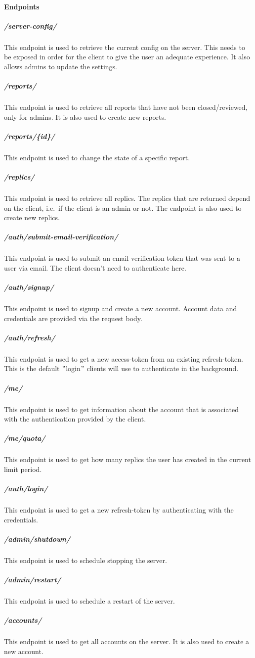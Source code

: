 \paragraph{Endpoints}

\subparagraph{/server-config/} This endpoint is used to retrieve the current config on the server.
This needs to be exposed in order for the client to give the user an adequate experience.
It also allows admins to update the settings.

\subparagraph{/reports/} This endpoint is used to retrieve all reports that have not been closed/reviewed, only for admins.
It is also used to create new reports.

\subparagraph{/reports/\{id\}/} This endpoint is used to change the state of a specific report.

\subparagraph{/replics/} This endpoint is used to retrieve all replics.
The replics that are returned depend on the client, i.e.\ if the client is an admin or not.
The endpoint is also used to create new replics.

\subparagraph{/auth/submit-email-verification/} This endpoint is used to submit an email-verification-token that was sent to a user via email.
The client doesn't need to authenticate here.

\subparagraph{/auth/signup/} This endpoint is used to signup and create a new account.
Account data and credentials are provided via the request body.

\subparagraph{/auth/refresh/} This endpoint is used to get a new access-token from an existing refresh-token.
This is the default \("\)login\("\) clients will use to authenticate in the background.

\subparagraph{/me/} This endpoint is used to get information about the account that is associated with the authentication provided by the client.

\subparagraph{/me/quota/} This endpoint is used to get how many replics the user has created in the current limit period.

\subparagraph{/auth/login/} This endpoint is used to get a new refresh-token by authenticating with the credentials.

\subparagraph{/admin/shutdown/} This endpoint is used to schedule stopping the server.

\subparagraph{/admin/restart/} This endpoint is used to schedule a restart of the server.

\subparagraph{/accounts/} This endpoint is used to get all accounts on the server.
It is also used to create a new account.

